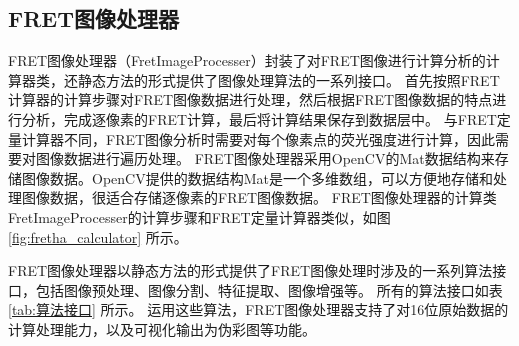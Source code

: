 \subsection{FRET图像处理器}
FRET图像处理器（FretImageProcesser）封装了对FRET图像进行计算分析的计算器类，还静态方法的形式提供了图像处理算法的一系列接口。
首先按照FRET计算器的计算步骤对FRET图像数据进行处理，然后根据FRET图像数据的特点进行分析，完成逐像素的FRET计算，最后将计算结果保存到数据层中。
与FRET定量计算器不同，FRET图像分析时需要对每个像素点的荧光强度进行计算，因此需要对图像数据进行遍历处理。
FRET图像处理器采用OpenCV的Mat数据结构来存储图像数据。OpenCV提供的数据结构Mat是一个多维数组，可以方便地存储和处理图像数据，很适合存储逐像素的FRET图像数据。
FRET图像处理器的计算类FretImageProcesser的计算步骤和FRET定量计算器类似，如图 \ref{fig:fretha_calculator} 所示。

FRET图像处理器以静态方法的形式提供了FRET图像处理时涉及的一系列算法接口，包括图像预处理、图像分割、特征提取、图像增强等。
所有的算法接口如表 \ref{tab:算法接口} 所示。
运用这些算法，FRET图像处理器支持了对16位原始数据的计算处理能力，以及可视化输出为伪彩图等功能。

